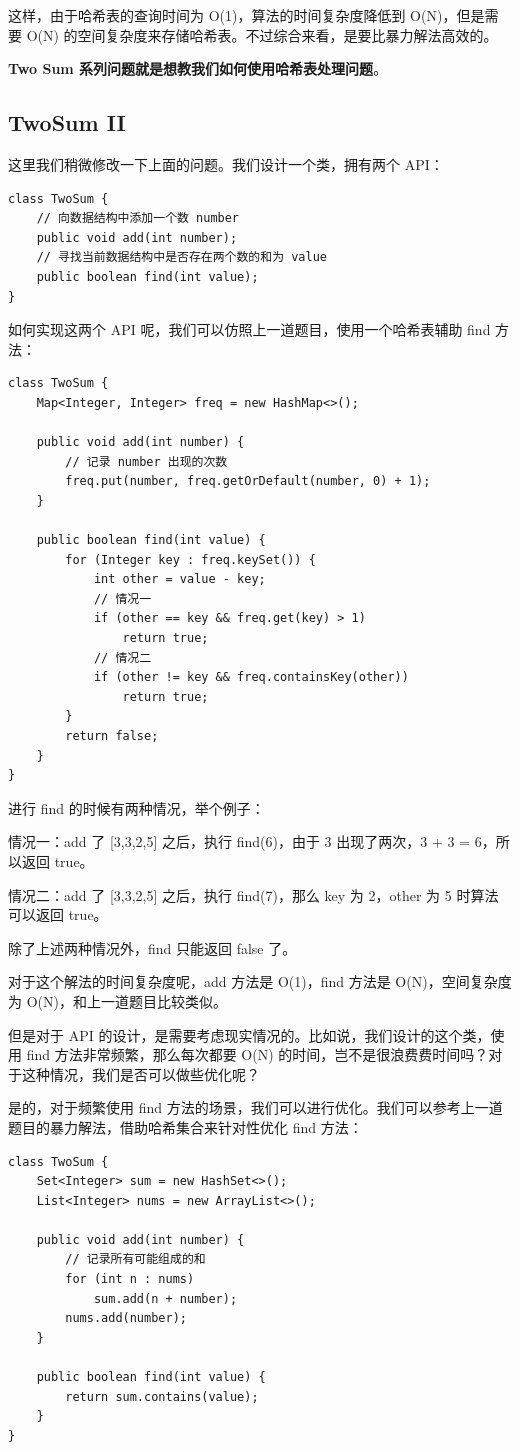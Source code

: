 \documentclass[12pt]{article}
\begin{document}
这样，由于哈希表的查询时间为 O(1)，算法的时间复杂度降低到 O(N)，但是需要 O(N) 的空间复杂度来存储哈希表。不过综合来看，是要比暴力解法高效的。

\textbf{Two Sum 系列问题就是想教我们如何使用哈希表处理问题}。

\subsection{TwoSum II}
这里我们稍微修改一下上面的问题。我们设计一个类，拥有两个 API：
\begin{lstlisting}
class TwoSum {
    // 向数据结构中添加一个数 number
    public void add(int number);
    // 寻找当前数据结构中是否存在两个数的和为 value
    public boolean find(int value);
}
\end{lstlisting}

如何实现这两个 API 呢，我们可以仿照上一道题目，使用一个哈希表辅助 find 方法：
\begin{lstlisting}
class TwoSum {
    Map<Integer, Integer> freq = new HashMap<>();

    public void add(int number) {
        // 记录 number 出现的次数
        freq.put(number, freq.getOrDefault(number, 0) + 1);
    }
    
    public boolean find(int value) {
        for (Integer key : freq.keySet()) {
            int other = value - key;
            // 情况一
            if (other == key && freq.get(key) > 1)
                return true;
            // 情况二
            if (other != key && freq.containsKey(other))
                return true;
        }
        return false;
    }
}
\end{lstlisting}
进行 find 的时候有两种情况，举个例子：

情况一：add 了 [3,3,2,5] 之后，执行 find(6)，由于 3 出现了两次，3 + 3 = 6，所以返回 true。

情况二：add 了 [3,3,2,5] 之后，执行 find(7)，那么 key 为 2，other 为 5 时算法可以返回 true。

除了上述两种情况外，find 只能返回 false 了。

对于这个解法的时间复杂度呢，add 方法是 O(1)，find 方法是 O(N)，空间复杂度为 O(N)，和上一道题目比较类似。

但是对于 API 的设计，是需要考虑现实情况的。比如说，我们设计的这个类，使用 find 方法非常频繁，那么每次都要 O(N) 的时间，岂不是很浪费费时间吗？对于这种情况，我们是否可以做些优化呢？

是的，对于频繁使用 find 方法的场景，我们可以进行优化。我们可以参考上一道题目的暴力解法，借助哈希集合来针对性优化 find 方法：
\begin{lstlisting}
class TwoSum {
    Set<Integer> sum = new HashSet<>();
    List<Integer> nums = new ArrayList<>();

    public void add(int number) {
        // 记录所有可能组成的和
        for (int n : nums)
            sum.add(n + number);
        nums.add(number);
    }
    
    public boolean find(int value) {
        return sum.contains(value);
    }
}
\end{lstlisting}
\end{document}
